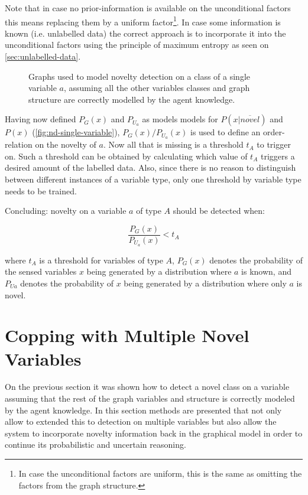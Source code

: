 Note that in case no prior-information is available on the unconditional
factors this means replacing them by a uniform factor\footnote{In case the
unconditional factors are uniform, this is the same as omitting the factors
from the graph structure.}. In case some information is known
(i.e. unlabelled data) the correct approach is to incorporate it into the
unconditional factors using the principle of maximum entropy as seen on
\autoref{sec:unlabelled-data}.

\begin{figure}[h]
\centering
{}
\qquad\qquad
{}

\caption{\label{fig:nd-single-variable}Graphs used to model novelty detection on
         a class of a single variable $a$, assuming all the other variables
         classes and graph structure are correctly modelled by the agent
         knowledge.}
\end{figure}

Having now defined $P_G(x)$ and $P_{U_a}$ as models models for
$P(x|\overline{novel})$ and $P(x)$ (\autoref{fig:nd-single-variable}),
$P_G(x)/P_{U_a}(x)$ is used to define an order-relation on the novelty of $a$.
Now all that is missing is a threshold $t_A$ to trigger on.
Such a threshold can be obtained by calculating which value of $t_A$
triggers a desired amount of the labelled data.
Also, since there is no reason to distinguish between different instances of
a variable type, only one threshold by variable type needs to be trained.

Concluding: novelty on a variable $a$ of type $A$ should be detected when:

\begin{equation}
\frac{P_G(x)}{P_{U_a}(x)} < t_A
\end{equation}

where $t_A$ is a threshold for variables of type $A$, $P_G(x)$ denotes the
probability of the sensed variables $x$ being generated by a distribution
where $a$ is known, and $P_{Ua}$ denotes the probability of $x$ being generated
by a distribution where only $a$ is novel.

\section{Copping with Multiple Novel Variables}
On the previous section it was shown how to detect a novel class on a variable
assuming that the rest of the graph variables and structure is correctly modeled
by the agent knowledge.
In this section methods are presented that not only allow to extended this to
detection on multiple variables but also allow the system to incorporate
novelty information back in the graphical model in order to continue its
probabilistic and uncertain reasoning.

